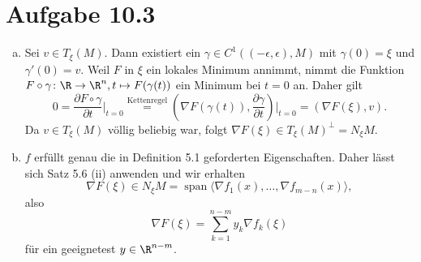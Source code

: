 \documentclass{article}
\begin{document}
    \section*{Aufgabe 10.3}
    \begin{enumerate}[(a)]
        \item Sei $v\in T_\xi(M)$. 
        Dann existiert ein $\gamma \in C^1((-\epsilon, \epsilon), M)$ mit $\gamma(0) = \xi$ und $\gamma'(0) = v$.
        Weil $F$ in $\xi$ ein lokales Minimum annimmt, nimmt die Funktion 
        $F\circ \gamma \colon \R \to \R^n, t \mapsto F(\gamma(t))$ ein Minimum bei $t = 0$ an.
        Daher gilt 
        \[
            0 = \frac{\partial F\circ \gamma}{\partial t}\bigg|_{t = 0} 
            \overset{\text{Kettenregel}}{=} (\nabla F(\gamma(t)), \frac{\partial \gamma}{\partial t})\bigg|_{t=0} 
            = (\nabla F(\xi), v).
        \]
        Da $v \in T_\xi (M)$ völlig beliebig war, folgt $\nabla F(\xi) \in T_\xi (M)^{\bot} = N_{\xi}M$.
        \item $f$ erfüllt genau die in Definition 5.1 geforderten Eigenschaften. 
        Daher lässt sich Satz 5.6 (ii) anwenden und wir erhalten
        \[ 
            \nabla F(\xi) \in N_\xi M = \operatorname{span} \langle \nabla f_1(x), \dots, \nabla f_{m-n}(x)\rangle,
        \]
        also 
        \[
            \nabla F(\xi) = \sum_{k = 1}^{n-m} y_k \nabla f_k(\xi)  
        \]
        für ein geeignetest $y \in \R^{n-m}$.
    \end{enumerate}
\end{document}
